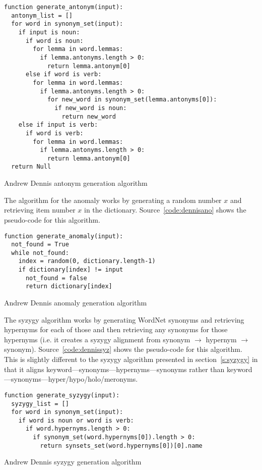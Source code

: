 \begin{listing}[!htbp] %
  \begin{verbatim}
function generate_antonym(input):
  antonym_list = []
  for word in synonym_set(input):
    if input is noun:
      if word is noun:
        for lemma in word.lemmas:
          if lemma.antonyms.length > 0:
            return lemma.antonym[0]
      else if word is verb:
        for lemma in word.lemmas:
          if lemma.antonyms.length > 0:
            for new_word in synonym_set(lemma.antonyms[0]):
              if new_word is noun:
                return new_word
    else if input is verb:
      if word is verb:
        for lemma in word.lemmas:
          if lemma.antonyms.length > 0:
            return lemma.antonym[0]
  return Null
  \end{verbatim}
\caption[Dennis antonym generation]{Andrew Dennis antonym generation algorithm}
\label{code:dennisanto}
\end{listing}

The algorithm for the anomaly works by generating a random number $x$ and retrieving item number $x$ in the dictionary. Source~\ref{code:dennisano} shows the pseudo-code for this algorithm.

\begin{listing}[!htbp] %
  \begin{verbatim}
function generate_anomaly(input):
  not_found = True
  while not_found:
    index = random(0, dictionary.length-1)
    if dictionary[index] != input
      not_found = false
      return dictionary[index]
  \end{verbatim}
\caption[Dennis anomaly generation]{Andrew Dennis anomaly generation algorithm}
\label{code:dennisano}
\end{listing}

The syzygy algorithm works by generating WordNet synonyms and retrieving hypernyms for each of those and then retrieving any synonyms for those hypernyms (i.e. it creates a syzygy alignment from synonym $\to$ hypernym $\to$ synonym). Source~\ref{code:dennissyz} shows the pseudo-code for this algorithm. This is slightly different to the syzygy algorithm presented in section~\ref{s:syzygy} in that it aligns keyword---synonyms---hypernyms---synonyms rather than keyword---synonyms---hyper/hypo/holo/meronyms.

\begin{listing}[!htbp] %
  \begin{verbatim}
function generate_syzygy(input):
  syzygy_list = []
  for word in synonym_set(input):
    if word is noun or word is verb:
      if word.hypernyms.length > 0:
        if synonym_set(word.hypernyms[0]).length > 0:
          return synsets_set(word.hypernyms[0])[0].name
  \end{verbatim}
\caption[Dennis syzygy generation]{Andrew Dennis syzygy generation algorithm}
\label{code:dennissyz}
\end{listing}

